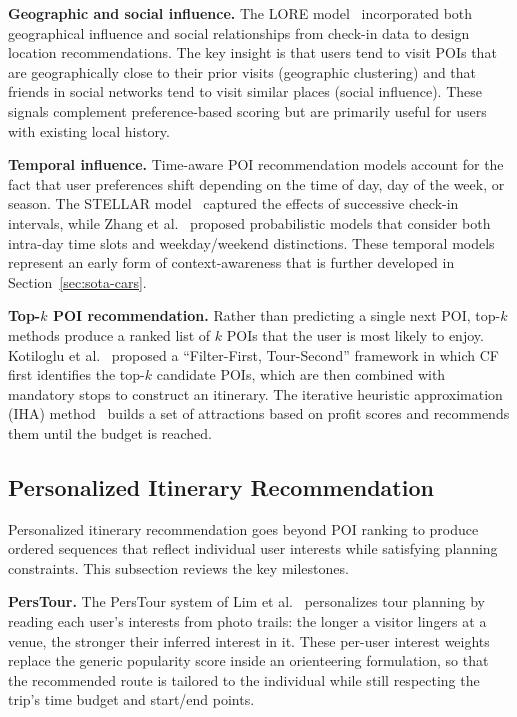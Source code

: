 \textbf{Geographic and social influence.} The LORE model~\cite{zhang2014lore} incorporated both geographical influence and social relationships from check-in data to design location recommendations. The key insight is that users tend to visit POIs that are geographically close to their prior visits (geographic clustering) and that friends in social networks tend to visit similar places (social influence). These signals complement preference-based scoring but are primarily useful for users with existing local history.

\textbf{Temporal influence.} Time-aware POI recommendation models account for the fact that user preferences shift depending on the time of day, day of the week, or season. The STELLAR model~\cite{zhao2016stellar} captured the effects of successive check-in intervals, while Zhang et al.~\cite{zhang2014timepoi} proposed probabilistic models that consider both intra-day time slots and weekday/weekend distinctions. These temporal models represent an early form of context-awareness that is further developed in Section~\ref{sec:sota-cars}.

\textbf{Top-$k$ POI recommendation.} Rather than predicting a single next POI, top-$k$ methods produce a ranked list of $k$ POIs that the user is most likely to enjoy. Kotiloglu et al.~\cite{kotiloglu2017topk} proposed a ``Filter-First, Tour-Second'' framework in which CF first identifies the top-$k$ candidate POIs, which are then combined with mandatory stops to construct an itinerary. The iterative heuristic approximation (IHA) method~\cite{lim2015iha} builds a set of attractions based on profit scores and recommends them until the budget is reached.

\subsection{Personalized Itinerary Recommendation}
\label{sec:sota-pers-itin}

Personalized itinerary recommendation goes beyond POI ranking to produce ordered sequences that reflect individual user interests while satisfying planning constraints. This subsection reviews the key milestones.

\textbf{PersTour.} The PersTour system of Lim et al.~\cite{lim2015photo} personalizes tour planning by reading each user's interests from photo trails: the longer a visitor lingers at a venue, the stronger their inferred interest in it. These per-user interest weights replace the generic popularity score inside an orienteering formulation, so that the recommended route is tailored to the individual while still respecting the trip's time budget and start/end points.

